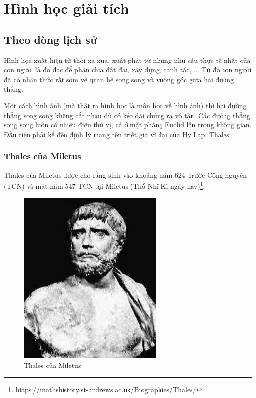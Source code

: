 \chapter{Hình học giải tích}

\section{Theo dòng lịch sử}

Hình học xuất hiện từ thời xa xưa, xuất phát từ những nhu cầu thực tế nhất của con người là đo đạc để phân chia đất đai, xây dựng, canh tác, ... Từ đó con người đã có nhận thức rất sớm về quan hệ song song và vuông góc giữa hai đường thẳng.

Một cách hình ảnh (mà thật ra hình học là môn học về hình ảnh) thì hai đường thẳng song song không cắt nhau dù có kéo dài chúng ra vô tận. Các đường thẳng song song luôn có nhiều điều thú vị, cả ở mặt phẳng Euclid lẫn trong không gian. Đầu tiên phải kể đến định lý mang tên triết gia vĩ đại của Hy Lạp: Thales.

\subsection*{Thales của Miletus}

Thales của Miletus được cho rằng sinh vào khoảng năm 624 Trước Công nguyên (TCN) và mất năm 547 TCN tại Miletus (Thổ Nhĩ Kì ngày nay)\footnote{\url{https://mathshistory.st-andrews.ac.uk/Biographies/Thales/}}.

\begin{figure}[ht]
	\centering
	\includegraphics[scale=0.5]{analytic_geometry/Thales.jpeg}
	\captionsetup{labelformat=empty}
	\caption{Thales của Miletus}
\end{figure}

